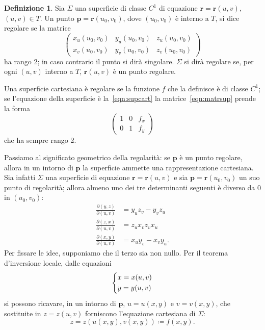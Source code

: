 \documentclass[a4paper]{book}
\numberwithin{equation}{section}
\theoremstyle{plain}
\theoremstyle{definition}
\newtheorem{defn}{Definizione}[section]
\theoremstyle{remark}
\renewcommand{\vec}{\boldsymbol}
\theoremstyle{example}
\begin{document}
\begin{defn}
Sia $\Sigma$ una superficie di classe $C^1$ di equazione $\vec{r} = \vec{r}(u,v)$, $(u, v) \in T$. Un punto $\vec{p} = \vec{r}(u_0, v_0)$, dove $(u_0, v_0)$ è interno a $T$, si dice regolare se la matrice
\begin{equation}
	\label{eqn:matrsup}
	\begin{pmatrix}
		x_u(u_0, v_0) & y_u(u_0, v_0) & z_u(u_0, v_0) \\
		x_v(u_0, v_0) & y_v(u_0, v_0) & z_v(u_0, v_0)
	\end{pmatrix}
\end{equation}
ha rango $2$; in caso contrario il punto si dirà singolare. $\Sigma$ si dirà regolare se, per ogni $(u, v)$ interno a $T$, $\vec{r}(u, v)$ è un punto regolare.
\end{defn}

Una superficie cartesiana è regolare se la funzione $f$ che la definisce è di classe $C^1$; se l'equazione della superficie è la~\eqref{eqn:supcart} la matrice~\eqref{eqn:matrsup} prende la forma
	\begin{equation*}
		\begin{pmatrix}
			1 & 0 & f_x \\
			0 & 1 & f_y
		\end{pmatrix}
	\end{equation*}
che ha sempre rango 2.

Passiamo al significato geometrico della regolarità: se $\vec{p}$ è un punto regolare, allora in un intorno di $\vec{p}$ la superficie ammette una rappresentazione cartesiana. Sia infatti $\Sigma$ una superficie di equazione $\vec{r} = \vec{r}(u, v)$ e sia $\vec{p} = \vec{r}(u_0, v_0)$ un suo punto di regolarità; allora almeno uno dei tre determinanti seguenti è diverso da $0$ in $(u_0, v_0)$:
	\begin{align*}
		\frac{\partial (y,z)}{\partial (u,v)} &= y_uz_v - y_vz_u \\
		\frac{\partial (z, x)}{\partial (u,v)} &= z_ux_v  z_vx_u \\
		\frac{\partial (x, y)}{\partial (u, v)} &= x_uy_v - x_vy_u.
	\end{align*}
	Per fissare le idee, supponiamo che il terzo sia non nullo. Per il teorema d'inversione locale, dalle equazioni
	\begin{equation*}
		\begin{dcases}
			x = x(u, v) \\
			y = y(u,v)
		\end{dcases}
	\end{equation*}
si possono ricavare, in un intorno di $\vec{p}$, $u = u(x, y)$ e $v = v(x, y)$, che sostituite in $z = z(u, v)$ forniscono l'equazione cartesiana di $\Sigma$:
	\begin{equation*}
		z = z(u(x, y), v(x, y)) \coloneqq f(x, y).
	\end{equation*}
\end{document}
